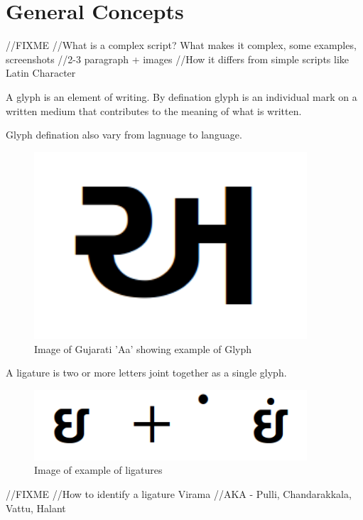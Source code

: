 \chapter{General Concepts}


//FIXME
//What is a complex script? What makes it complex, some examples, screenshots
//2-3 paragraph + images
//How it differs from simple scripts like Latin Character

A glyph is an element of writing. By defination glyph is an individual mark on
a written medium that contributes to the meaning of what is written.

Glyph defination also vary from lagnuage to language.

\begin{figure}[hb]
\centering
\includegraphics[width=4in]{Images/glyph.png}
\caption[Glyph example]
{Image of Gujarati 'Aa' showing example of Glyph}
 \end{figure}


A ligature is two or more letters joint together as a single glyph.

\begin{figure}[hb]
\centering
\includegraphics[width=4in]{Images/ligature.png}
\caption[Ligature example]
{Image of example of ligatures}
 \end{figure}

//FIXME
//How to identify a ligature Virama
//AKA - Pulli, Chandarakkala, Vattu, Halant

